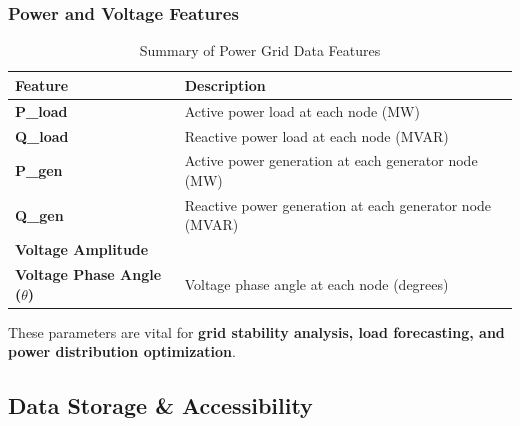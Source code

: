 \documentclass[12pt]{article}
\begin{document}
\subsubsection*{Power and Voltage Features}
\begin{table}[h]
    \centering
    \begin{tabular}{ll}
        \toprule
        \textbf{Feature} & \textbf{Description} \\
        \midrule
        \textbf{P\_load} & Active power load at each node (MW) \\
        \textbf{Q\_load} & Reactive power load at each node (MVAR) \\
        \textbf{P\_gen} & Active power generation at each generator node (MW) \\
        \textbf{Q\_gen} & Reactive power generation at each generator node (MVAR) \\
        \textbf{Voltage Amplitude} &   \\
        \textbf{Voltage Phase Angle (\(\theta\))} & Voltage phase angle at each node (degrees) \\
        \bottomrule
    \end{tabular}
    \caption{Summary of Power Grid Data Features}
    \label{tab:grid}
\end{table}

These parameters are vital for \textbf{grid stability analysis, load forecasting, and power distribution optimization}.

\subsection*{Data Storage \& Accessibility}

\end{document}
